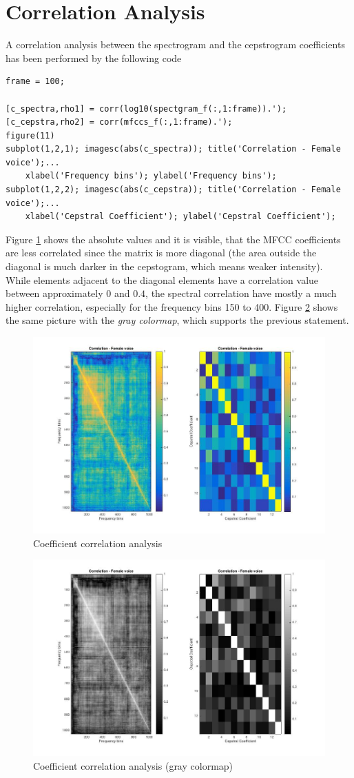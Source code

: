 \section{Correlation Analysis}
A correlation analysis between the spectrogram and the cepstrogram coefficients has been performed by the following code
\begin{lstlisting}
frame = 100;

[c_spectra,rho1] = corr(log10(spectgram_f(:,1:frame)).');
[c_cepstra,rho2] = corr(mfccs_f(:,1:frame).');
figure(11)
subplot(1,2,1); imagesc(abs(c_spectra)); title('Correlation - Female voice');...
    xlabel('Frequency bins'); ylabel('Frequency bins');
subplot(1,2,2); imagesc(abs(c_cepstra)); title('Correlation - Female voice');...
    xlabel('Cepstral Coefficient'); ylabel('Cepstral Coefficient');
\end{lstlisting}

Figure \ref{fig:11} shows the absolute values and it is visible, that the MFCC coefficients are less correlated since the matrix is more diagonal (the area outside the diagonal is much darker in the cepstogram, which means weaker intensity).\\While elements adjacent to the diagonal elements have a correlation value between approximately $0$ and $0.4$, the spectral correlation have mostly a much higher correlation, especially for the frequency bins 150 to 400. Figure \ref{fig:11_gray} shows the same picture with the \textit{gray colormap}, which supports the previous statement.

\begin{figure}[h]
		\centering
	\includegraphics[width=0.75\linewidth]{./images/11.jpg}
		\caption{Coefficient correlation analysis}
		\label{fig:11}	
\end{figure}

\begin{figure}[h]
		\centering
		\includegraphics[width=0.75\linewidth]{./images/11_gray.jpg}
		\caption{Coefficient correlation analysis (gray colormap)}
		\label{fig:11_gray}	
\end{figure}
